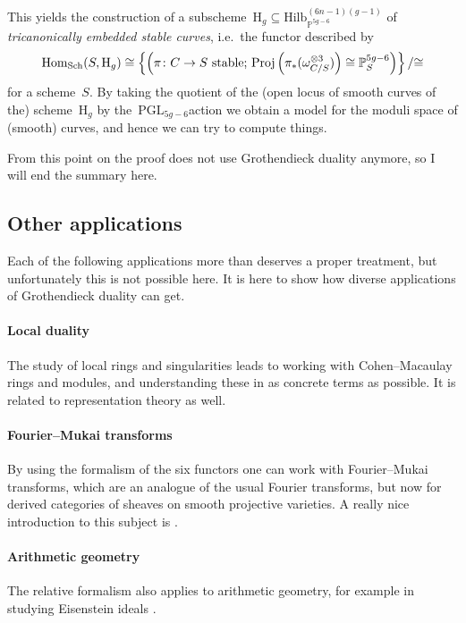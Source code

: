 \documentclass[10pt,a4paper]{article}
\begin{document}
This yields the construction of a subscheme~$\mathrm{H}_g\subseteq\mathrm{Hilb}_{\mathbb{P}^{5g-6}}^{(6n-1)(g-1)}$ of \emph{tricanonically embedded stable curves}, i.e.\ the functor described by
\begin{equation}
  \operatorname{Hom}_{\mathrm{Sch}}(S,\mathrm{H}_g)\cong\left\{ \left( \text{$\pi\colon C\to S$ stable; $\operatorname{Proj}\left( \pi_*(\omega_{C/S}^{\otimes 3}) \right)\cong\mathbb{P}_S^{5g-6}$} \right) \right\}/{\cong}
\end{equation}
for a scheme~$S$. By taking the quotient of the (open locus of smooth curves of the) scheme~$\mathrm{H}_g$ by the~$\mathrm{PGL}_{5g-6}$\dash action we obtain a model for the moduli space of (smooth) curves, and hence we can try to compute things.

From this point on the proof does not use Grothendieck duality anymore, so I will end the summary here.


\subsection{Other applications}
Each of the following applications more than deserves a proper treatment, but unfortunately this is not possible here. It is here to show how diverse applications of Grothendieck duality can get.

\paragraph{Local duality}
The study of local rings and singularities leads to working with Cohen--Macaulay rings and modules, and understanding these in as concrete terms as possible. It is related to representation theory as well.

\paragraph{Fourier--Mukai transforms}
By using the formalism of the six functors one can work with Fourier--Mukai transforms, which are an analogue of the usual Fourier transforms, but now for derived categories of sheaves on smooth projective varieties. A really nice introduction to this subject is \cite{huybrechts-fourier-mukai}.

\paragraph{Arithmetic geometry}
The relative formalism also applies to arithmetic geometry, for example in studying Eisenstein ideals \cite{mazur-modular-curves-eisenstein-ideal}.
\end{document}

